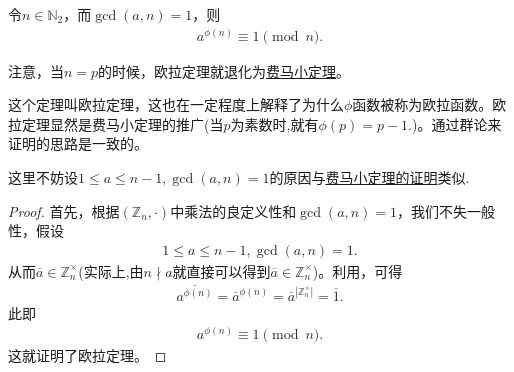 \documentclass[../../main.tex]{subfiles}
\begin{document}
\begin{theorem}[Euler定理]\label{theorem:Euler定理}
令$n \in \mathbb{N}_2$，而$\gcd(a, n) = 1$，则
\begin{align*}
a^{\phi(n)} \equiv 1 \pmod{n}.
\end{align*}
\end{theorem}
\begin{remark}
注意，当$n = p$的时候，欧拉定理就退化为\hyperref[theorem:Fermat小定理]{费马小定理}。 
\end{remark}
\begin{note}
这个定理叫欧拉定理，这也在一定程度上解释了为什么$\phi$函数被称为欧拉函数。欧拉定理显然是费马小定理的推广(当$p$为素数时,就有$\phi (p)=p-1.$)。通过群论来证明的思路是一致的。
\end{note}
\begin{remark}
这里不妨设$1 \leqslant a \leqslant n - 1, \gcd(a, n) = 1 $的原因与\hyperref[theorem:Fermat小定理]{费马小定理的证明}类似.
\end{remark}
\begin{proof}
首先，根据$(\mathbb{Z}_n, \cdot)$中乘法的良定义性和$\gcd(a, n) = 1$，我们不失一般性，假设
\begin{align*}
1 \leqslant a \leqslant n - 1, \gcd(a, n) = 1 .
\end{align*}
从而$\overline{a} \in \mathbb{Z}_n^\times$(实际上,由$n \nmid a$就直接可以得到$\overline{a} \in \mathbb{Z}_n^\times$)。利用，可得
\begin{align*}
\overline{a^{\phi(n)}}=\overline{a}^{\phi(n)}=\overline{a}^{|\mathbb{Z}_n^\times|} = \overline{1} .
\end{align*}
此即
\begin{align*}
a^{\phi(n)} \equiv 1 \pmod{n} .
\end{align*}
这就证明了欧拉定理。
\end{proof}
\end{document}
